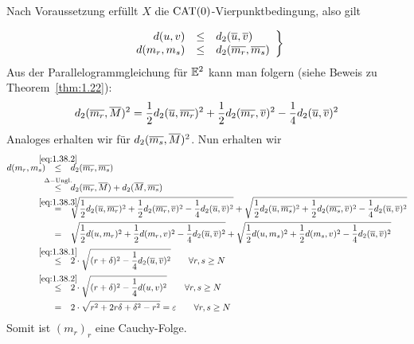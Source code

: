 \begin{beweis}
\begin{description}
\begin{figure}[h]
	\end{figure}

	Nach Voraussetzung erfüllt $X$ die $\operatorname{CAT(0)}$-Vierpunktbedingung, also gilt
	
	\begin{equation}
		\left. \begin{array}{rcl}
			d(u,v) & \leq & d_2(\overline{u},\overline{v}) \\
			d(m_r,m_s) & \leq & d_2(\overline{m_r},\overline{m_s})
		\end{array} \right\} \label{eq:1.38.2}
	\end{equation}
	Aus der Parallelogrammgleichung für $\mathbb{E}^2$ kann man folgern (siehe Beweis zu Theorem~\ref{thm:1.22}):
	\begin{equation}
		d_2(\overline{m_r},\overline{M})^2 = \frac{1}{2} d_2 (\overline{u}, \overline{m_r})^2 + \frac{1}{2} d_2 (\overline{m_r},\overline{v})^2 - \frac{1}{4} d_2(\overline{u},\overline{v})^2 \label{eq:1.38.3}
	\end{equation}
	Analoges erhalten wir für $d_2(\overline{m_s},\overline{M})^2$.
	Nun erhalten wir
	\begin{align*}
		d(m_r,m_s) &\stack{\eqref{eq:1.38.2}}{\leq} d_2(\ol{m_r},\ol{m_s}) \\
		&\stack{\Delta-\text{Ungl.}}{\leq} d_2(\ol{m_r},\ol{M}) + d_2(\ol{M},\ol{m_s}) \\
		&\stack{\eqref{eq:1.38.3}}{=} \sqrt{\frac{1}{2} d_2(\ol{u},\ol{m_r})^2 + \frac{1}{2} d_2(\ol{m_r},\ol{v})^2 - \frac{1}{4} d_2(\ol{u},\ol{v})^2}
		+ \sqrt{\frac{1}{2} d_2(\ol{u},\ol{m_s})^2 + \frac{1}{2} d_2(\ol{m_s},\ol{v})^2 - \frac{1}{4} d_2(\ol{u},\ol{v})^2} \\
		&\stack{}{=} \sqrt{\frac{1}{2} d(u,m_r)^2 + \frac{1}{2} d(m_r,v)^2 - \frac{1}{4} d_2(\ol{u},\ol{v})^2}
		+ \sqrt{\frac{1}{2} d(u,m_s)^2 + \frac{1}{2} d(m_s,v)^2 - \frac{1}{4} d_2(\ol{u},\ol{v})^2} \\
		&\stack{\eqref{eq:1.38.1}}{\leq} 2 \cdot \sqrt{(r+\delta)^2 - \frac{1}{4} d_2(\ol{u},\ol{v})^2} \qquad \forall r,s \geq N \\
		&\stack{\eqref{eq:1.38.2}}{\leq} 2 \cdot \sqrt{(r+\delta)^2 - \frac{1}{4} d(u,v)^2} \qquad \forall r,s \geq N \\
		&\stack{}{=} 2 \cdot \sqrt{r^2 + 2r \delta + \delta^2 - r^2} = \varepsilon \qquad \forall r,s \geq N
	\end{align*}
	Somit ist $(m_r)_r$ eine Cauchy-Folge.
	

\end{description}
\end{beweis}
